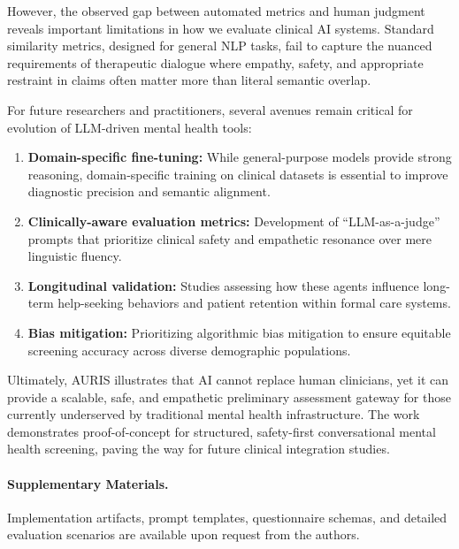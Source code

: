 \documentclass[sigconf]{acmart}
\begin{document}
However, the observed gap between automated metrics and human judgment reveals important limitations in how we evaluate clinical AI systems. Standard similarity metrics, designed for general NLP tasks, fail to capture the nuanced requirements of therapeutic dialogue where empathy, safety, and appropriate restraint in claims often matter more than literal semantic overlap.

For future researchers and practitioners, several avenues remain critical for evolution of LLM-driven mental health tools:
\begin{enumerate}
    \item \textbf{Domain-specific fine-tuning:} While general-purpose models provide strong reasoning, domain-specific training on clinical datasets is essential to improve diagnostic precision and semantic alignment.
    \item \textbf{Clinically-aware evaluation metrics:} Development of ``LLM-as-a-judge'' prompts that prioritize clinical safety and empathetic resonance over mere linguistic fluency.
    \item \textbf{Longitudinal validation:} Studies assessing how these agents influence long-term help-seeking behaviors and patient retention within formal care systems.
    \item \textbf{Bias mitigation:} Prioritizing algorithmic bias mitigation to ensure equitable screening accuracy across diverse demographic populations.
\end{enumerate}

Ultimately, AURIS illustrates that AI cannot replace human clinicians, yet it can provide a scalable, safe, and empathetic preliminary assessment gateway for those currently underserved by traditional mental health infrastructure. The work demonstrates proof-of-concept for structured, safety-first conversational mental health screening, paving the way for future clinical integration studies.

\paragraph{Supplementary Materials.} Implementation artifacts, prompt templates, questionnaire schemas, and detailed evaluation scenarios are available upon request from the authors.
\end{document}
